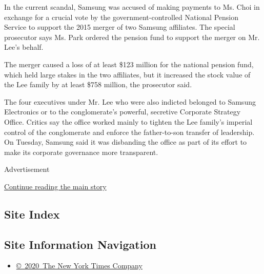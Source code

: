 In the current scandal, Samsung was accused of making payments to Ms.
Choi in exchange for a crucial vote by the government-controlled
National Pension Service to support the 2015 merger of two Samsung
affiliates. The special prosecutor says Ms. Park ordered the pension
fund to support the merger on Mr. Lee's behalf.

The merger caused a loss of at least \$123 million for the national
pension fund, which held large stakes in the two affiliates, but it
increased the stock value of the Lee family by at least \$758 million,
the prosecutor said.

The four executives under Mr. Lee who were also indicted belonged to
Samsung Electronics or to the conglomerate's powerful, secretive
Corporate Strategy Office. Critics say the office worked mainly to
tighten the Lee family's imperial control of the conglomerate and
enforce the father-to-son transfer of leadership. On Tuesday, Samsung
said it was disbanding the office as part of its effort to make its
corporate governance more transparent.

Advertisement

\protect\hyperlink{after-bottom}{Continue reading the main story}

\hypertarget{site-index}{%
\subsection{Site Index}\label{site-index}}

\hypertarget{site-information-navigation}{%
\subsection{Site Information
Navigation}\label{site-information-navigation}}

\begin{itemize}
\tightlist
\item
  \href{https://help.nytimes.com/hc/en-us/articles/115014792127-Copyright-notice}{©~2020~The
  New York Times Company}
\end{itemize}

